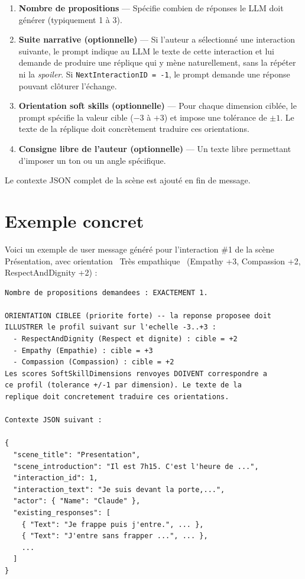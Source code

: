 \begin{enumerate}
    \item \textbf{Nombre de propositions} --- Sp\'ecifie combien de r\'eponses le LLM doit g\'en\'erer (typiquement 1 \`a 3).

    \item \textbf{Suite narrative (optionnelle)} --- Si l'auteur a s\'electionn\'e une interaction suivante, le prompt indique au LLM le texte de cette interaction et lui demande de produire une r\'eplique qui y m\`ene naturellement, sans la r\'ep\'eter ni la \textit{spoiler}. Si \texttt{NextInteractionID = -1}, le prompt demande une r\'eponse pouvant cl\^oturer l'\'echange.

    \item \textbf{Orientation soft skills (optionnelle)} --- Pour chaque dimension cibl\'ee, le prompt sp\'ecifie la valeur cible ($-3$ \`a $+3$) et impose une tol\'erance de $\pm 1$. Le texte de la r\'eplique doit concr\`etement traduire ces orientations.

    \item \textbf{Consigne libre de l'auteur (optionnelle)} --- Un texte libre permettant d'imposer un ton ou un angle sp\'ecifique.
\end{enumerate}

Le contexte JSON complet de la sc\`ene est ajout\'e en fin de message.

\section{Exemple concret}

Voici un exemple de user message g\'en\'er\'e pour l'interaction \#1 de la sc\`ene Pr\'esentation, avec orientation \guillemotleft\ Tr\`es empathique\ \guillemotright{} (Empathy +3, Compassion +2, RespectAndDignity +2) :

\begin{lstlisting}[basicstyle=\ttfamily\scriptsize, frame=single, breaklines=true, xleftmargin=1em]
Nombre de propositions demandees : EXACTEMENT 1.

ORIENTATION CIBLEE (priorite forte) -- la reponse proposee doit
ILLUSTRER le profil suivant sur l'echelle -3..+3 :
  - RespectAndDignity (Respect et dignite) : cible = +2
  - Empathy (Empathie) : cible = +3
  - Compassion (Compassion) : cible = +2
Les scores SoftSkillDimensions renvoyes DOIVENT correspondre a
ce profil (tolerance +/-1 par dimension). Le texte de la
replique doit concretement traduire ces orientations.

Contexte JSON suivant :

{
  "scene_title": "Presentation",
  "scene_introduction": "Il est 7h15. C'est l'heure de ...",
  "interaction_id": 1,
  "interaction_text": "Je suis devant la porte,...",
  "actor": { "Name": "Claude" },
  "existing_responses": [
    { "Text": "Je frappe puis j'entre.", ... },
    { "Text": "J'entre sans frapper ...", ... },
    ...
  ]
}
\end{lstlisting}


